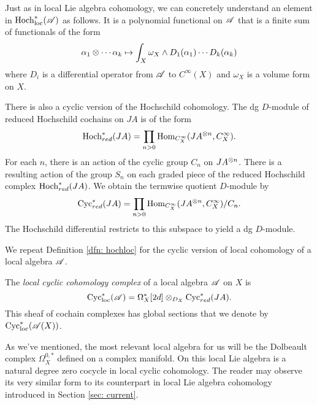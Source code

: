 Just as in local Lie algebra cohomology, we can concretely understand an element in ${\rm Hoch}_{\rm loc}^*(\mathscr A)$ as follows.
It is a polynomial functional on $\mathscr A$ that is a finite sum of functionals of the form
\[
\alpha_1 \otimes \cdots \alpha_k \mapsto \int_X \omega_X \wedge D_1(\alpha_1) \cdots D_k(\alpha_k)
\]
where $D_i$ is a differential operator from $\mathscr A$ to $C^\infty(X)$ and $\omega_X$ is a volume form on $X$. 

There is also a cyclic version of the Hochschild cohomology. 
The dg $D$-module of reduced Hochschild cochains on $JA$ is of the form
\[
{\rm Hoch}_{red}^* (JA) = \prod_{n > 0} {\rm Hom}_{C^\infty_X} (JA^{\otimes n}, C^\infty_X) .
\]
For each $n$, there is an action of the cyclic group $C_n$ on $JA^{\otimes n}$. 
There is a resulting action of the group $S_n$ on each graded piece of the reduced Hochschild complex ${\rm Hoch}_{red}^* (JA)$.
We obtain the termwise quotient $D$-module by
\[
{\rm Cyc}_{red}^* (JA) = \prod_{n > 0} {\rm Hom}_{C^\infty_X} (JA^{\otimes n}, C^\infty_X) / C_n .
\]
The Hochschild differential restricts to this subspace to yield a dg $D$-module. 

We repeat Definition \ref{dfn: hochloc} for the cyclic version of local cohomology of a local algebra $\mathscr A$. 

\begin{dfn}\label{dfn: cycloc}
The {\em local cyclic cohomology complex}  of a local algebra $\mathscr A$ on $X$ is 
\[
{\rm Cyc}_{\rm loc}^*(\mathscr A) = \Omega^*_X[2d] \otimes_{D_X} {\rm Cyc}^*_{red} (JA) .
\] 
This sheaf of cochain complexes has global sections that we denote by ${\rm Cyc}_{\rm loc}^*(\mathscr A(X))$.
\end{dfn}

As we've mentioned, the most relevant local algebra for us will be the Dolbeault complex $\Omega^{0,*}_X$ defined on a complex manifold. 
On this local Lie algebra is a natural degree zero cocycle in local cyclic cohomology.
The reader may observe its very similar form to its counterpart in local Lie algebra cohomology introduced in Section \ref{sec: current}. 

